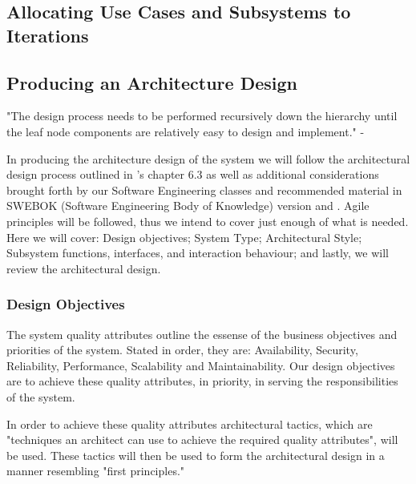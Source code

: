 \documentclass[11pt]{article}
\begin{document}
\subsection{Allocating Use Cases and Subsystems to Iterations}

\subsection{Producing an Architecture Design}

"The design process needs to be performed recursively down the hierarchy until the leaf node components are relatively easy to design and implement." - \cite{Book:1}

In producing the architecture design of the system we will follow the architectural design process outlined in \cite{Book:1}'s chapter 6.3 as well as additional considerations brought forth by our Software Engineering classes and recommended material in SWEBOK (Software Engineering Body of Knowledge) version and \cite{Book:2}. Agile principles will be followed, thus we intend to cover just enough of what is needed. Here we will cover: Design objectives; System Type; Architectural Style; Subsystem functions, interfaces, and interaction behaviour; and lastly, we will review the architectural design.

\subsubsection{Design Objectives}

The system quality attributes outline the essense of the business objectives and priorities of the system. Stated in order, they are: Availability, Security, Reliability, Performance, Scalability and Maintainability. Our design objectives are to achieve these quality attributes, in priority, in serving the responsibilities of the system. 

In order to achieve these quality attributes architectural tactics, which are "techniques an architect can use to achieve the required quality attributes"\cite{Book:2}, will be used. These tactics will then be used to form the architectural design in a manner resembling "first principles." 
\end{document}
